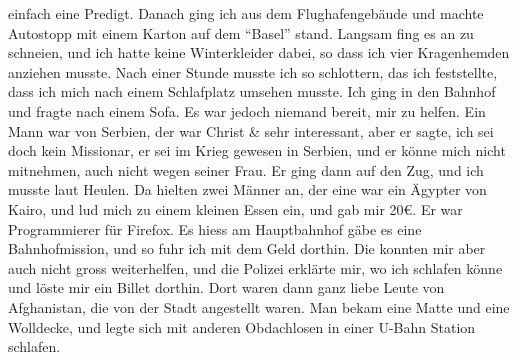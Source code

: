 \documentclass[
]{article}
\begin{document}
einfach eine Predigt. Danach ging ich aus dem Flughafengebäude und
machte Autostopp mit einem Karton auf dem ``Basel'' stand. Langsam fing
es an zu schneien, und ich hatte keine Winterkleider dabei, so dass ich
vier Kragenhemden anziehen musste. Nach einer Stunde musste ich so
schlottern, das ich feststellte, dass ich mich nach einem Schlafplatz
umsehen musste. Ich ging in den Bahnhof und fragte nach einem Sofa. Es
war jedoch niemand bereit, mir zu helfen. Ein Mann war von Serbien, der
war Christ \& sehr interessant, aber er sagte, ich sei doch kein
Missionar, er sei im Krieg gewesen in Serbien, und er könne mich nicht
mitnehmen, auch nicht wegen seiner Frau. Er ging dann auf den Zug, und
ich musste laut Heulen. Da hielten zwei Männer an, der eine war ein
Ägypter von Kairo, und lud mich zu einem kleinen Essen ein, und gab mir
20€. Er war Programmierer für Firefox. Es hiess am Hauptbahnhof gäbe es
eine Bahnhofmission, und so fuhr ich mit dem Geld dorthin. Die konnten
mir aber auch nicht gross weiterhelfen, und die Polizei erklärte mir, wo
ich schlafen könne und löste mir ein Billet dorthin. Dort waren dann
ganz liebe Leute von Afghanistan, die von der Stadt angestellt waren.
Man bekam eine Matte und eine Wolldecke, und legte sich mit anderen
Obdachlosen in einer U-Bahn Station schlafen.
\end{document}
